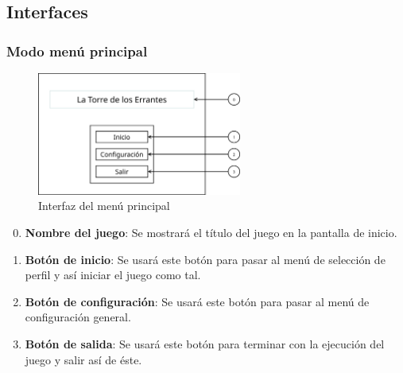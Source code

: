 \subsection{Interfaces} %



\subsubsection{Modo menú principal}
\begin{figure}[H]
    \centering
    \includegraphics[width=0.6\textwidth]{5-Cuerpo/Chapter5/5.5/I1.png} %
    \caption{Interfaz del menú principal}
    \label{fig:Interface_Menu_Principal}
\end{figure}
\begin{enumerate}\setcounter{enumi}{-1}
    \item \textbf{Nombre del juego}: Se mostrará el título del juego en la
    pantalla de inicio.
    \item \textbf{Botón de inicio}: Se usará este botón para pasar al menú de
    selección de perfil y así iniciar el juego como tal.
    \item \textbf{Botón de configuración}: Se usará este botón para pasar al
    menú de configuración general.
    \item \textbf{Botón de salida}: Se usará este botón para terminar con la
    ejecución del juego y salir así de éste.
\end{enumerate}

